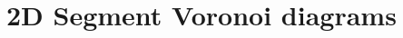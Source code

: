 
\chapter{2D Segment Voronoi diagrams}
\label{chapter-segvor2}

\vspace*{-10mm}
\minitoc
\vspace*{30mm}



